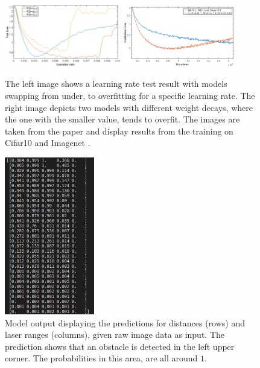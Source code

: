  \begin{figure}[h]%
\centering
\includegraphics[width=0.45\textwidth]{Bilder/learning_rate_test.png} 
\hspace{1.0 cm}
\includegraphics[width=0.45\textwidth]{Bilder/overfitting_underfitting.png} 
\caption[]{The left image shows a learning rate test result with models swapping from under, to overfitting for a specific learning rate. The right image depicts two models with different weight decays, where the one with the smaller value, tends to overfit. The images are taken from the paper \cite{DBLP:journals/corr/abs-1803-09820} and display results from the training on Cifar10 \cite{cifar} and Imagenet \cite{imagenet_cvpr09}.}
\label{overfitting}
\end{figure}

\begin{figure}
\centering
\includegraphics[width=0.35\textwidth]{Bilder/numpy_pred_shape.png}
\captionsetup{width=0.35\textwidth}
\caption{Model output displaying the predictions for distances (rows) and laser ranges (columns), given raw image data as input. The prediction shows that an obstacle is detected in the left upper corner. The probabilities in this area, are all around $1$.}
\label{numpy_pred_shape}
\vspace{5pt}
\end{figure}

